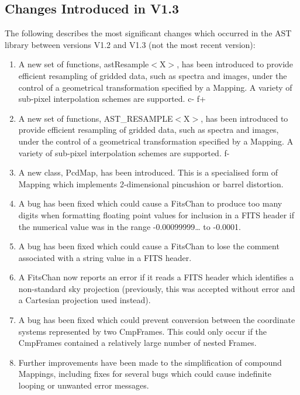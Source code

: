 \documentclass[twoside,11pt]{article}
\begin{document}
\subsection{Changes Introduced in V1.3}

The following describes the most significant changes which occurred in
the AST library between versions V1.2 and V1.3 (not the most recent
version):

\begin{enumerate}
c+
\item A new set of functions, astResample$<$X$>$, has been introduced to
provide	efficient resampling of gridded data, such as spectra and
images, under the control of a geometrical transformation specified by
a Mapping. A variety of sub-pixel interpolation schemes are supported.
c-
f+
\item A new set of functions, AST\_RESAMPLE$<$X$>$, has been introduced to
provide	efficient resampling of gridded data, such as spectra and
images, under the control of a geometrical transformation specified by
a Mapping. A variety of sub-pixel interpolation schemes are supported.
f-

\item A new class, PcdMap, has been introduced. This is a specialised
form of Mapping which implements 2-dimensional pincushion or barrel
distortion.

\item A bug has been fixed which could cause a FitsChan to produce too
many digits when formatting floating point values for inclusion in a
FITS header if the numerical value was in the range -0.00099999\ldots
to -0.0001.

\item A bug has been fixed which could cause a FitsChan to lose the
comment associated with a string value in a FITS header.

\item A FitsChan now reports an error if it reads a FITS header which
identifies a non-standard sky projection (previously, this was
accepted without error and a Cartesian projection used instead).

\item A bug has been fixed which could prevent conversion between the
coordinate systems represented by two CmpFrames. This could only occur
if the CmpFrames contained a relatively large number of nested Frames.

%
\item Further improvements have been made to the simplification of
compound Mappings, including fixes for several bugs which could cause
indefinite looping or unwanted error messages.


\end{enumerate}
\end{document}
